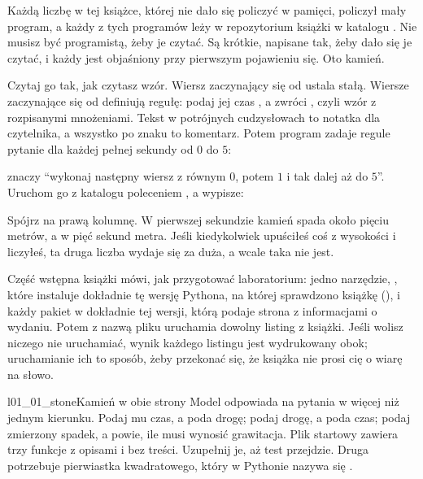 \noindent
Każdą liczbę w tej książce, której nie dało się policzyć w pamięci, policzył
mały program, a każdy z tych programów leży w repozytorium książki w
katalogu . Nie musisz być programistą, żeby je czytać. Są
krótkie, napisane tak, żeby dało się je czytać, i każdy jest objaśniony przy
pierwszym pojawieniu się. Oto kamień.


\noindent
Czytaj go tak, jak czytasz wzór. Wiersz zaczynający się od 
ustala stałą. Wiersze zaczynające się od  definiują
regułę: podaj jej czas , a zwróci , czyli wzór
z rozpisanymi mnożeniami. Tekst w potrójnych cudzysłowach to notatka dla
czytelnika, a wszystko po znaku \code{\#} to komentarz. Potem program
zadaje regule pytanie dla każdej pełnej sekundy od $0$ do $5$:


\noindent
{} znaczy \enquote{wykonaj następny wiersz z
 równym $0$, potem $1$ i tak dalej aż do $5$}. Uruchom go z katalogu
 poleceniem , a
wypisze:


\noindent
Spójrz na prawą kolumnę. W pierwszej sekundzie kamień spada około pięciu
metrów, a w pięć sekund  metra. Jeśli kiedykolwiek
upuściłeś coś z wysokości i liczyłeś, ta druga liczba wydaje się za duża,
a wcale taka nie jest.

\begin{note}
Część wstępna książki mówi, jak przygotować laboratorium: jedno narzędzie,
, które instaluje dokładnie tę wersję Pythona, na której sprawdzono
książkę (\pypatch), i każdy pakiet w dokładnie tej wersji, którą podaje
strona z informacjami o wydaniu. Potem  z nazwą pliku uruchamia
dowolny listing z książki. Jeśli wolisz niczego nie uruchamiać, wynik
każdego listingu jest wydrukowany obok; uruchamianie ich to sposób, żeby
przekonać się, że książka nie prosi cię o wiarę na słowo.
\end{note}

\begin{lab}{l01_01_stone}{Kamień w obie strony}
Model odpowiada na pytania w więcej niż jednym kierunku. Podaj mu czas, a
poda drogę; podaj drogę, a poda czas; podaj zmierzony spadek, a powie, ile
musi wynosić grawitacja. Plik startowy zawiera trzy funkcje z opisami i bez
treści. Uzupełnij je, aż test przejdzie. Druga potrzebuje pierwiastka
kwadratowego, który w Pythonie nazywa się .
\end{lab}

